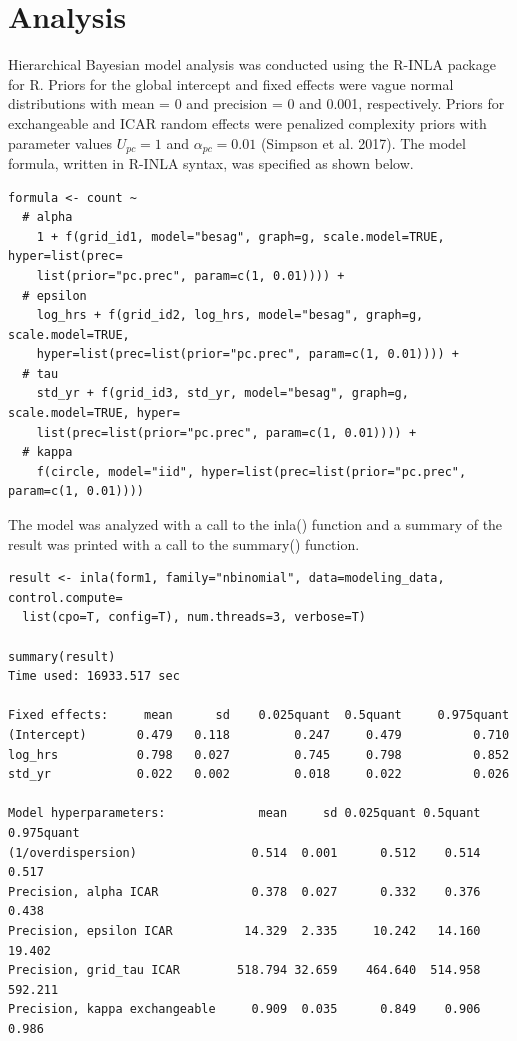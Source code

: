 \documentclass[]{article}
\begin{document}
\section{Analysis}
Hierarchical Bayesian model analysis was conducted using the R-INLA package for R. Priors for the global intercept and fixed effects were vague normal distributions with mean = 0 and precision = 0 and 0.001, respectively. Priors for exchangeable and ICAR random effects were penalized complexity priors with parameter values $U_{pc} = 1$ and $\alpha_{pc} = 0.01$ (Simpson et al. 2017). The model formula, written in R-INLA syntax, was specified as shown below.

\begin{verbatim}
formula <- count ~
  # alpha
    1 + f(grid_id1, model="besag", graph=g, scale.model=TRUE, hyper=list(prec=
    list(prior="pc.prec", param=c(1, 0.01)))) +
  # epsilon
    log_hrs + f(grid_id2, log_hrs, model="besag", graph=g, scale.model=TRUE, 
    hyper=list(prec=list(prior="pc.prec", param=c(1, 0.01)))) +
  # tau
    std_yr + f(grid_id3, std_yr, model="besag", graph=g, scale.model=TRUE, hyper=
    list(prec=list(prior="pc.prec", param=c(1, 0.01)))) +
  # kappa
    f(circle, model="iid", hyper=list(prec=list(prior="pc.prec", param=c(1, 0.01))))
\end{verbatim}

The model was analyzed with a call to the inla() function and a summary of the result was printed with a call to the summary() function.

\begin{verbatim}
result <- inla(form1, family="nbinomial", data=modeling_data, control.compute=
  list(cpo=T, config=T), num.threads=3, verbose=T)

summary(result)
Time used: 16933.517 sec

Fixed effects:     mean      sd    0.025quant  0.5quant     0.975quant
(Intercept)       0.479   0.118         0.247     0.479          0.710
log_hrs           0.798   0.027         0.745     0.798          0.852
std_yr            0.022   0.002         0.018     0.022          0.026

Model hyperparameters:             mean     sd 0.025quant 0.5quant 0.975quant
(1/overdispersion)                0.514  0.001      0.512    0.514      0.517
Precision, alpha ICAR             0.378  0.027      0.332    0.376      0.438
Precision, epsilon ICAR          14.329  2.335     10.242   14.160     19.402
Precision, grid_tau ICAR        518.794 32.659    464.640  514.958    592.211
Precision, kappa exchangeable     0.909  0.035      0.849    0.906      0.986
\end{verbatim}
\end{document}
